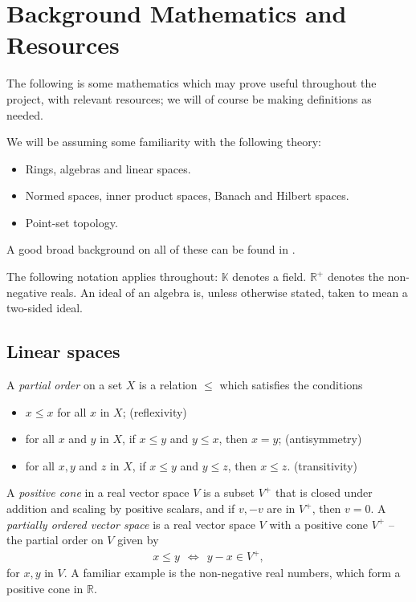 \documentclass[12pt,a4paper]{report}
\theoremstyle{plain}
\theoremstyle{definition}
\newcommand{\1}{\mathbbm{1}}
\newcommand{\R}{\mathbb{R}}
\begin{document}
\chapter{Background Mathematics and Resources}	
The following is some mathematics which may prove useful throughout the project, with relevant 
resources; we will of course be making definitions as needed.
	
We will be assuming some familiarity with the following theory:
\begin{itemize}
	\item Rings, algebras and linear spaces.
	\item Normed spaces, inner product spaces, Banach and Hilbert spaces.
	\item Point-set topology.
\end{itemize}
A good broad background on all of these can be found in \cite{simmons83}.


	
	
The following notation applies throughout:
$\mathbb{K}$ denotes a field. $\R^+$ denotes the non-negative reals. An ideal of an algebra is, unless 
otherwise stated, taken to mean a two-sided ideal. 

\section{Linear spaces}

A \emph{partial order} on a set $X$ is a relation $\leq$ which satisfies the conditions
\begin{itemize}
	\item $x \leq x$ for all $x$ in $X$; 		\hfill (reflexivity)
	\item for all $x$ and $y$ in $X$, if $x \leq y$ and $y\leq x$, then $x=y$; 
												\hfill (antisymmetry)
	\item for all $x,y$ and $z$ in $X$, if $x \leq y$ and $y\leq z$, then $x\leq z$. 
												\hfill (transitivity)
\end{itemize}

A \emph{positive cone} in a real vector space $V$ is a subset $V^+$ that is closed under addition and scaling by positive scalars, and if $v,-v$ are in $V^+$, then $v=0$. A \emph{partially ordered vector space} is a real vector space $V$ with a positive cone $V^+$ -- the partial order on $V$ given by
\begin{align*}
	x\leq y ~~\iff~~ y-x \in V^+,
\end{align*}
for $x,y$ in $V$.
A familiar example is the non-negative real numbers, which form a positive cone in $\R$.
\end{document}
